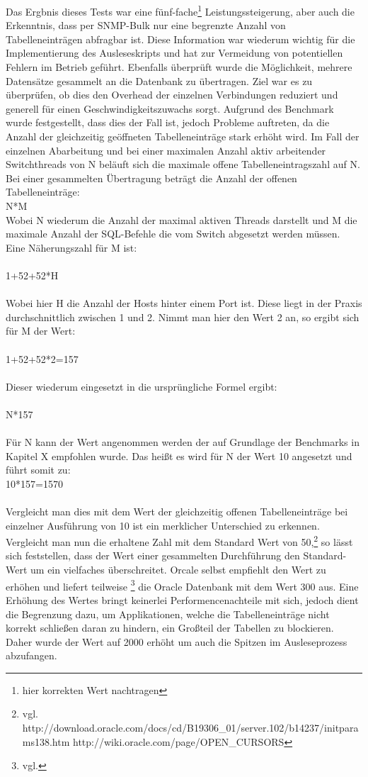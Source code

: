 Das Ergbnis dieses Tests war eine fünf-fache\footnote{hier korrekten Wert nachtragen} Leistungssteigerung, aber auch die Erkenntnis, dass per SNMP-Bulk nur eine begrenzte Anzahl von Tabelleneinträgen abfragbar ist. Diese Information war wiederum wichtig für die Implementierung des Ausleseskripts und hat zur Vermeidung von potentiellen Fehlern im Betrieb geführt. Ebenfalls überprüft wurde die Möglichkeit, mehrere Datensätze gesammelt an die Datenbank zu übertragen. Ziel war es zu überprüfen, ob dies den Overhead der einzelnen Verbindungen reduziert und generell für einen Geschwindigkeitszuwachs sorgt. Aufgrund des Benchmark wurde festgestellt, dass dies der Fall ist, jedoch Probleme auftreten, da die Anzahl der gleichzeitig geöffneten Tabelleneinträge stark erhöht wird. Im Fall der einzelnen Abarbeitung und bei einer maximalen Anzahl aktiv arbeitender Switchthreads von N beläuft sich die maximale offene Tabelleneintragszahl auf N.
\\ Bei einer gesammelten Übertragung beträgt die Anzahl der offenen Tabelleneinträge:\\
N*M\\
Wobei N wiederum die Anzahl der maximal aktiven Threads darstellt und M die maximale Anzahl der SQL-Befehle die vom Switch abgesetzt werden müssen. Eine Näherungszahl für M ist:\\
\\
1+52+52*H\\
\\
Wobei hier H die Anzahl der Hosts hinter einem Port ist. Diese liegt in der Praxis durchschnittlich zwischen 1 und 2. Nimmt man hier den Wert 2 an, so ergibt sich für M der Wert:\\
\\
1+52+52*2=157\\
\\
Dieser wiederum eingesetzt in die ursprüngliche Formel ergibt:\\
\\
N*157\\
\\
Für N kann der Wert angenommen werden der auf Grundlage der Benchmarks in Kapitel X empfohlen wurde. Das heißt es wird für N der Wert 10 angesetzt und führt somit zu:
\\
10*157=1570\\
\\
Vergleicht man dies mit dem Wert der gleichzeitig offenen Tabelleneinträge bei einzelner Ausführung von 10 ist ein merklicher Unterschied zu erkennen. Vergleicht man nun die erhaltene Zahl mit dem Standard Wert von 50,\footnote{vgl. http://download.oracle.com/docs/cd/B19306\_01/server.102/b14237/initparams138.htm  http://wiki.oracle.com/page/OPEN\_CURSORS} so lässt sich feststellen, dass der Wert einer gesammelten Durchführung den Standard-Wert um ein vielfaches überschreitet. Orcale selbst empfiehlt den Wert zu erhöhen und liefert teilweise \footnote{vgl.} die Oracle Datenbank mit dem Wert 300 aus. Eine Erhöhung des Wertes bringt keinerlei Performencenachteile mit sich, jedoch dient die Begrenzung dazu, um Applikationen, welche die Tabelleneinträge nicht korrekt schließen daran zu hindern, ein Großteil der Tabellen zu blockieren. Daher wurde der Wert auf 2000 erhöht um auch die Spitzen im Ausleseprozess abzufangen.\\

